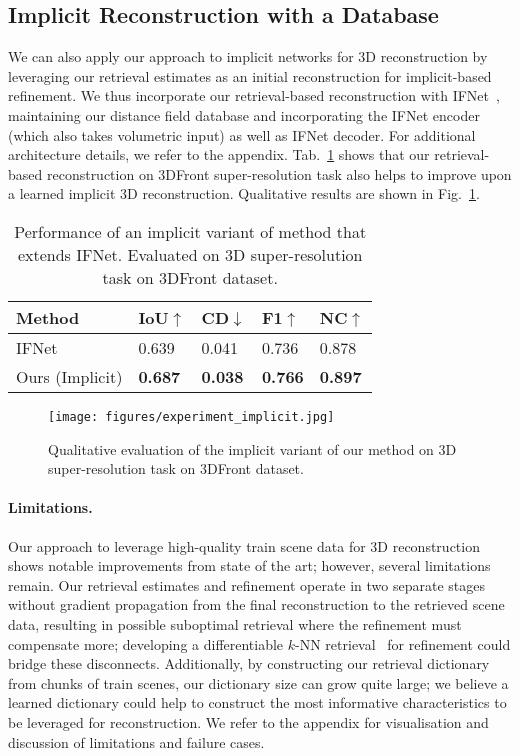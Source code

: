 \subsection{Implicit Reconstruction with a Database}
We can also apply our approach to implicit networks for 3D reconstruction by leveraging our retrieval estimates as an initial reconstruction for implicit-based refinement.
We thus incorporate our retrieval-based reconstruction with IFNet~\cite{chibane2020implicit}, maintaining our distance field database and incorporating the IFNet encoder (which also takes volumetric input) as well as IFNet decoder.
For additional architecture details, we refer to the appendix.
Tab.~\ref{tab:implicit_variant} shows that our retrieval-based reconstruction on 3DFront super-resolution task also helps to improve upon a learned implicit 3D reconstruction. Qualitative results are shown in Fig.~\ref{fig:experiment_implicit}.
\begin{table}
\centering
\small
\begin{tabular}{|l|l|l|l|l|} 
\hline
Method & IoU$\uparrow$ & CD$\downarrow$ & F1$\uparrow$ & NC$\uparrow$ \\ 
\hline
IFNet & 0.639 & 0.041 & 0.736 & 0.878 \\ 
Ours (Implicit) & {\bf 0.687} & {\bf 0.038} & {\bf 0.766} & {\bf 0.897} \\ 
\hline
\end{tabular}
\vspace{-0.15cm}
\caption{Performance of an implicit variant of method that extends IFNet. Evaluated on 3D super-resolution task on 3DFront dataset.}
\label{tab:implicit_variant}
\vspace{-0.5cm}
\end{table}

\begin{figure}
	\centering
	\texttt{[image: figures/experiment\_implicit.jpg]}
	\vspace{-0.6cm}
	\caption{Qualitative evaluation of the implicit variant of our method on 3D super-resolution task on 3DFront dataset.}
	\label{fig:experiment_implicit}
	\vspace{-0.5cm}
\end{figure}

\paragraph{Limitations.}
Our approach to leverage high-quality train scene data for 3D reconstruction shows notable improvements from state of the art; however, several limitations remain.
Our retrieval estimates and refinement operate in two separate stages without gradient propagation from the final reconstruction to the retrieved scene data, resulting in possible suboptimal retrieval where the refinement must compensate more; developing a differentiable $k$-NN retrieval~\cite{plotz2018neural,tseng2020retrievegan} for refinement could bridge these disconnects.
Additionally, by constructing our retrieval dictionary from chunks of train scenes, our dictionary size can grow quite large; we believe a learned dictionary could help to construct the most informative characteristics to be leveraged for reconstruction.
We refer to the appendix for visualisation and discussion of limitations and failure cases.
